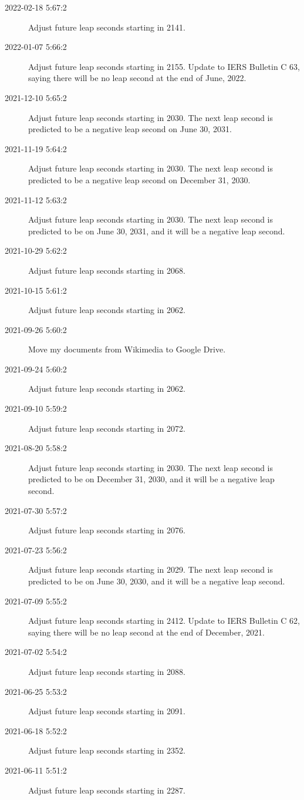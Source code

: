 \documentclass[letterpaper,twoside]{article}
\begin{document}
\begin{description}
\item[2022-02-18 5:67:2]Adjust future leap seconds starting in 2141.
\item[2022-01-07 5:66:2]Adjust future leap seconds starting in 2155.
  Update to IERS Bulletin C 63, saying there will be no leap second
  at the end of June, 2022.
\item[2021-12-10 5:65:2]Adjust future leap seconds starting in 2030.
  The next leap second is predicted to be a negative leap second
  on June 30, 2031.
\item[2021-11-19 5:64:2]Adjust future leap seconds starting in 2030.
  The next leap second is predicted to be a negative leap second
  on December 31, 2030.
\item[2021-11-12 5:63:2]Adjust future leap seconds starting in 2030.
  The next leap second is predicted to be on June 30, 2031, and it
  will be a negative leap second.
\item[2021-10-29 5:62:2]Adjust future leap seconds starting in 2068.
\item[2021-10-15 5:61:2]Adjust future leap seconds starting in 2062.
\item[2021-09-26 5:60:2]Move my documents from Wikimedia to Google Drive.
\item[2021-09-24 5:60:2]Adjust future leap seconds starting in 2062.
\item[2021-09-10 5:59:2]Adjust future leap seconds starting in 2072.
\item[2021-08-20 5:58:2]Adjust future leap seconds starting in 2030.
  The next leap second is predicted to be on December 31, 2030, and it
  will be a negative leap second.
\item[2021-07-30 5:57:2]Adjust future leap seconds starting in 2076.
\item[2021-07-23 5:56:2]Adjust future leap seconds starting in 2029.
  The next leap second is predicted to be on June 30, 2030, and it
  will be a negative leap second.
\item[2021-07-09 5:55:2]Adjust future leap seconds starting in 2412.
  Update to IERS Bulletin C 62, saying there will be no leap second
  at the end of December, 2021.
\item[2021-07-02 5:54:2]Adjust future leap seconds starting in 2088.
\item[2021-06-25 5:53:2]Adjust future leap seconds starting in 2091.
\item[2021-06-18 5:52:2]Adjust future leap seconds starting in 2352.
\item[2021-06-11 5:51:2]Adjust future leap seconds starting in 2287.

\end{description}
\end{document}
